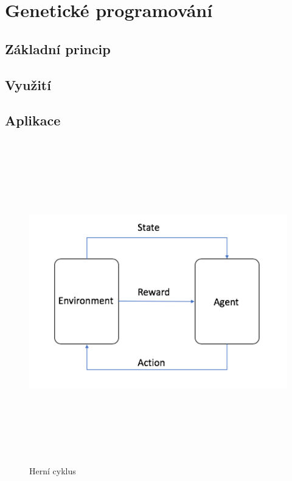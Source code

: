 
\chapter{Genetické programování}

\section{Základní princip}


\section{Využití}

\section{Aplikace}





\begin{figure}[p]\centering
\includegraphics[width=140mm, height=140mm]{./agent_enviroment}
\caption{Herní cyklus}
\label{obr03:Nhust}
\end{figure}

